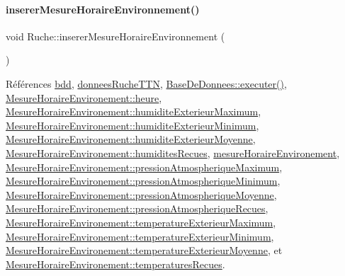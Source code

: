 \paragraph{\texorpdfstring{inserer\+Mesure\+Horaire\+Environnement()}{insererMesureHoraireEnvironnement()}}
{\footnotesize\ttfamily void Ruche\+::inserer\+Mesure\+Horaire\+Environnement (\begin{DoxyParamCaption}{ }\end{DoxyParamCaption})\hspace{0.3cm}{\ttfamily [private]}}



Références \hyperlink{class_ruche_a8577fdedabdecd98652e338e83bb3b65}{bdd}, \hyperlink{class_ruche_a4556832042641c08a6ef2ab9d80d771e}{donnees\+Ruche\+T\+TN}, \hyperlink{class_base_de_donnees_aa8de5f8f8bb17edc43f5c0ee33712081}{Base\+De\+Donnees\+::executer()}, \hyperlink{struct_mesure_horaire_environement_a83295c95940d9edae2d082a94f49e1c9}{Mesure\+Horaire\+Environement\+::heure}, \hyperlink{struct_mesure_horaire_environement_abb2c00c4262837d9e1122573283d86ec}{Mesure\+Horaire\+Environement\+::humidite\+Exterieur\+Maximum}, \hyperlink{struct_mesure_horaire_environement_a1621bd692dc352708d1931a48df9a596}{Mesure\+Horaire\+Environement\+::humidite\+Exterieur\+Minimum}, \hyperlink{struct_mesure_horaire_environement_a25909e0885ee3588c637b738ced303d7}{Mesure\+Horaire\+Environement\+::humidite\+Exterieur\+Moyenne}, \hyperlink{struct_mesure_horaire_environement_a4348771984d70b9ea7867dba511db336}{Mesure\+Horaire\+Environement\+::humidites\+Recues}, \hyperlink{class_ruche_a73a826506110c10d9221065670985e52}{mesure\+Horaire\+Environement}, \hyperlink{struct_mesure_horaire_environement_a9b82da49ea52c6f118f25433a16e22d4}{Mesure\+Horaire\+Environement\+::pression\+Atmospherique\+Maximum}, \hyperlink{struct_mesure_horaire_environement_a3d42b48772717461f7395cdae5ff925f}{Mesure\+Horaire\+Environement\+::pression\+Atmospherique\+Minimum}, \hyperlink{struct_mesure_horaire_environement_a6ae12cb9b6ac6a46f7c08e60049c7b72}{Mesure\+Horaire\+Environement\+::pression\+Atmospherique\+Moyenne}, \hyperlink{struct_mesure_horaire_environement_a5db5e56af7d297b500912489126f7305}{Mesure\+Horaire\+Environement\+::pression\+Atmospherique\+Recues}, \hyperlink{struct_mesure_horaire_environement_aaf73ec5bb5a7c8235c56dc4ea3c4d89c}{Mesure\+Horaire\+Environement\+::temperature\+Exterieur\+Maximum}, \hyperlink{struct_mesure_horaire_environement_ae9737a62128ecf2614901ebe0b118548}{Mesure\+Horaire\+Environement\+::temperature\+Exterieur\+Minimum}, \hyperlink{struct_mesure_horaire_environement_a40be086e9b2454c0e70066a523a1b066}{Mesure\+Horaire\+Environement\+::temperature\+Exterieur\+Moyenne}, et \hyperlink{struct_mesure_horaire_environement_a3444440b836c4893e8d61c3eb5c3e42d}{Mesure\+Horaire\+Environement\+::temperatures\+Recues}.



